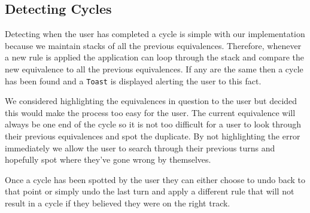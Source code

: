 \documentclass{report}
\begin{document}
\subsection{Detecting Cycles}
\label{sub:detecting_cycles}

Detecting when the user has completed a cycle is simple with our implementation because we maintain stacks of all the previous equivalences. Therefore, whenever a new rule is applied the application can loop through the stack and compare the new equivalence to all the previous equivalences. If any are the same then a cycle has been found and a {\tt Toast} is displayed alerting the user to this fact.

We considered highlighting the equivalences in question to the user but decided this would make the process too easy for the user. The current equivalence will always be one end of the cycle so it is not too difficult for a user to look through their previous equivalences and spot the duplicate. By not highlighting the error immediately we allow the user to search through their previous turns and hopefully spot where they've gone wrong by themselves.

Once a cycle has been spotted by the user they can either choose to undo back to that point or simply undo the last turn and apply a different rule that will not result in a cycle if they believed they were on the right track.
\end{document}

